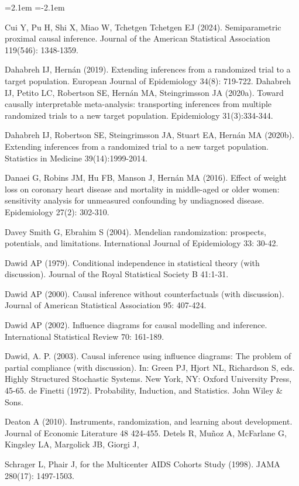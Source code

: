 \begin{list}{}{\leftmargin=2.1em   \itemindent=-2.1em \parsep=0pt \itemsep=1.6pt \topsep=4pt \rightmargin=0pt}
\item Cui Y, Pu H, Shi X, Miao W, Tchetgen Tchetgen EJ (2024). Semiparametric proximal causal inference. Journal of the American Statistical Association 119(546): 1348-1359.
\item Dahabreh IJ, Hernán (2019). Extending inferences from a randomized trial to a target population. European Journal of Epidemiology 34(8): 719-722. Dahabreh IJ, Petito LC, Robertson SE, Hernán MA, Steingrimsson JA (2020a). Toward causally interpretable meta-analysis: transporting inferences from multiple randomized trials to a new target population. Epidemiology 31(3):334-344.
\item Dahabreh IJ, Robertson SE, Steingrimsson JA, Stuart EA, Hernán MA (2020b). Extending inferences from a randomized trial to a new target population. Statistics in Medicine 39(14):1999-2014.
\item Danaei G, Robins JM, Hu FB, Manson J, Hernán MA (2016). Effect of weight loss on coronary heart disease and mortality in middle-aged or older women: sensitivity analysis for unmeasured confounding by undiagnosed disease. Epidemiology 27(2): 302-310.
\item Davey Smith G, Ebrahim S (2004). Mendelian randomization: prospects, potentials, and limitations. International Journal of Epidemiology 33: 30-42.
\item Dawid AP (1979). Conditional independence in statistical theory (with discussion). Journal of the Royal Statistical Society B 41:1-31.
\item Dawid AP (2000). Causal inference without counterfactuals (with discussion). Journal of American Statistical Association 95: 407-424.
\item Dawid AP (2002). Influence diagrams for causal modelling and inference. International Statistical Review 70: 161-189.
\item Dawid, A. P. (2003). Causal inference using influence diagrams: The problem of partial compliance (with discussion). In: Green PJ, Hjort NL, Richardson S, eds. Highly Structured Stochastic Systems. New York, NY: Oxford University Press, 45-65. de Finetti (1972). Probability, Induction, and Statistics. John Wiley \& Sons.
\item Deaton A (2010). Instruments, randomization, and learning about development. Journal of Economic Literature 48 424-455. Detels R, Muñoz A, McFarlane G, Kingsley LA, Margolick JB, Giorgi J,
\item Schrager L, Phair J, for the Multicenter AIDS Cohorts Study (1998). JAMA 280(17): 1497-1503.

\end{list}
